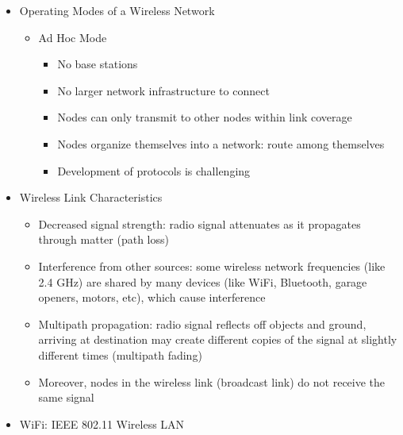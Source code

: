 \begin{itemize}
  \item Operating Modes of a Wireless Network

    \begin{itemize}

      \item Ad Hoc Mode

        \begin{itemize}

          \item No base stations

          \item No larger network infrastructure to connect

          \item Nodes can only transmit to other nodes within link coverage

          \item Nodes organize themselves into a network: route among themselves

          \item Development of protocols is challenging

        \end{itemize}

    \end{itemize}

  \item Wireless Link Characteristics

    \begin{itemize}

      \item Decreased signal strength: radio signal attenuates as it propagates through matter (path loss)

      \item Interference from other sources: some wireless network frequencies (like 2.4 GHz) are shared by many devices (like WiFi, Bluetooth, garage openers, motors, etc), which cause interference

      \item Multipath propagation: radio signal reflects off objects and ground, arriving at destination may create different copies of the signal at slightly different times (multipath fading)

      \item Moreover, nodes in the wireless link (broadcast link) do not receive the same signal

    \end{itemize}

  \item WiFi: IEEE 802.11 Wireless LAN


\end{itemize}
